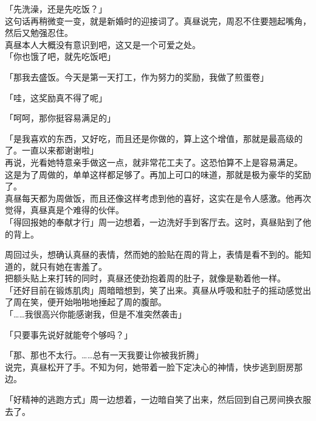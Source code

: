 「先洗澡，还是先吃饭？」\\

这句话再稍微变一变，就是新婚时的迎接词了。真昼说完，周忍不住要翘起嘴角，然后又勉强忍住。\\

真昼本人大概没有意识到吧，这又是一个可爱之处。\\

「你也饿了吧，就先吃饭吧」

「那我去盛饭。今天是第一天打工，作为努力的奖励，我做了煎蛋卷」

「哇，这奖励真不得了呢」

「呵呵，那你挺容易满足的」

「是我喜欢的东西，又好吃，而且还是你做的，算上这个增值，那就是最高级的了。一直以来都谢谢啦」\\

再说，光看她特意亲手做这一点，就非常花工夫了。这恐怕算不上是容易满足。\\

这是为了周做的，单单这样都足够了。再加上可口的味道，那就是极为豪华的奖励了。\\

真昼每天都为周做饭，而且还像这样考虑到他的喜好，这实在是令人感激。他再次觉得，真昼真是个难得的伙伴。\\

「得回报她的奉献才行」周一边想着，一边洗好手到客厅去。这时，真昼贴到了他的背上。

周回过头，想确认真昼的表情，然而她的脸贴在周的背上，表情是看不到的。能知道的，就只有她在害羞了。\\

把额头贴上来打转的同时，真昼还使劲抱着周的肚子，就像是勒着他一样。\\

「还好目前在锻炼肌肉」周暗暗想到，笑了出来。真昼从呼吸和肚子的摇动感觉出了周在笑，便开始啪啪地捶起了周的腹部。\\

「……我很高兴你能感谢我，但是不准突然袭击」

「只要事先说好就能夸个够吗？」

「那、那也不太行。……总有一天我要让你被我折腾」\\

说完，真昼松开了手。不知为何，她带着一脸下定决心的神情，快步逃到厨房那边。

「好精神的逃跑方式」周一边想着，一边暗自笑了出来，然后回到自己房间换衣服去了。\\

